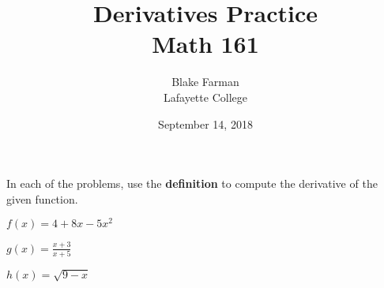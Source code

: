 \documentclass[10pt]{amsart}
\title[Derivatives]{Derivatives Practice\\Math 161}
\date{September 14, 2018}
\author[Blake Farman]{Blake Farman\\Lafayette College}
\begin{document}
\maketitle

\makenameslot

In each of the problems, use the \textbf{definition} to compute the derivative of the given function.

\begin{thm}
  \(\displaystyle{f(x) = 4 + 8x - 5x^2}\)
\end{thm}


\vspace{2in}
\begin{thm}
  \(\displaystyle{g(x) = \frac{x + 3}{x + 5}}\)
\end{thm}

\newpage
\begin{thm}
  \(\displaystyle{h(x) = \sqrt{9 -x}}\)
\end{thm}
\end{document}
